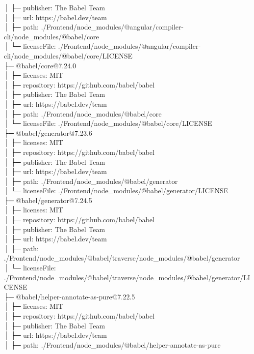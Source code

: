 │  ├─ publisher: The Babel Team\\
│  ├─ url: https://babel.dev/team\\
│  ├─ path: ./Frontend/node\_modules/@angular/compiler-cli/node\_modules/@babel/core\\
│  └─ licenseFile: ./Frontend/node\_modules/@angular/compiler-cli/node\_modules/@babel/core/LICENSE\\
├─ @babel/core@7.24.0\\
│  ├─ licenses: MIT\\
│  ├─ repository: https://github.com/babel/babel\\
│  ├─ publisher: The Babel Team\\
│  ├─ url: https://babel.dev/team\\
│  ├─ path: ./Frontend/node\_modules/@babel/core\\
│  └─ licenseFile: ./Frontend/node\_modules/@babel/core/LICENSE\\
├─ @babel/generator@7.23.6\\
│  ├─ licenses: MIT\\
│  ├─ repository: https://github.com/babel/babel\\
│  ├─ publisher: The Babel Team\\
│  ├─ url: https://babel.dev/team\\
│  ├─ path: ./Frontend/node\_modules/@babel/generator\\
│  └─ licenseFile: ./Frontend/node\_modules/@babel/generator/LICENSE\\
├─ @babel/generator@7.24.5\\
│  ├─ licenses: MIT\\
│  ├─ repository: https://github.com/babel/babel\\
│  ├─ publisher: The Babel Team\\
│  ├─ url: https://babel.dev/team\\
│  ├─ path: ./Frontend/node\_modules/@babel/traverse/node\_modules/@babel/generator\\
│  └─ licenseFile: ./Frontend/node\_modules/@babel/traverse/node\_modules/@babel/generator/LICENSE\\
├─ @babel/helper-annotate-as-pure@7.22.5\\
│  ├─ licenses: MIT\\
│  ├─ repository: https://github.com/babel/babel\\
│  ├─ publisher: The Babel Team\\
│  ├─ url: https://babel.dev/team\\
│  ├─ path: ./Frontend/node\_modules/@babel/helper-annotate-as-pure\\
